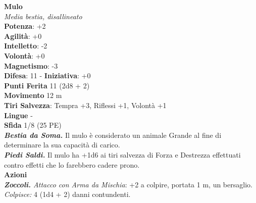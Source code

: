 \begin{multicols}{2}
\medskip\textbf{Mulo}\\
\emph{Media bestia, disallineato}\\
\textbf{Potenza}: +2\\
\textbf{Agilità}: +0\\
\textbf{Intelletto}: -2\\
\textbf{Volontà}: +0\\
\textbf{Magnetismo}: -3\\
\textbf{Difesa}: 11 - \textbf{Iniziativa}: +0\\
\textbf{Punti Ferita} 11 (2d8 + 2)\\
\textbf{Movimento} 12 m\\
\textbf{Tiri Salvezza}: Tempra +3, Riflessi +1, Volontà +1 \\
\textbf{Lingue} -\\
\textbf{Sfida} 1/8 (25 PE)\smallskip\\
\emph{\textbf{Bestia da Soma.}} Il mulo è considerato un animale Grande al fine di determinare la sua capacità di carico.\\
\emph{\textbf{Piedi Saldi.}} Il mulo ha +1d6 ai tiri salvezza di Forza e Destrezza effettuati contro effetti che lo farebbero cadere prono.\\
\smallskip\textbf{Azioni}\\
\emph{\textbf{Zoccoli.} Attacco con Arma da Mischia}: +2 a colpire, portata 1 m, un bersaglio.\\
\emph{Colpisce:} 4 (1d4 + 2) danni contundenti.\\



\end{multicols}
